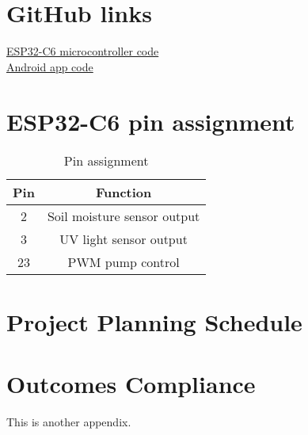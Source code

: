 \chapter{GitHub links}
\makeatletter{}\makeatother
\label{appen:derivations_bigramseg}

\href{https://github.com/22546723/skripsie_esp32_code}{ESP32-C6 microcontroller code} \\
\href{https://github.com/22546723/skripsie_android_app}{Android app code}

\chapter{ESP32-C6 pin assignment}
\makeatletter{}\makeatother
\label{appen:derivations_bigramseg}

\begin{table}[!h]
    \centering
    \begin{tabular}{|c|c|}
        \hline
        Pin & Function \\
        \hline
        2 & Soil moisture sensor output \\
        3 & UV light sensor output \\
        23 & PWM pump control \\
        \hline
    \end{tabular}
    \caption{Pin assignment}
    \label{tab:pin_assignment}
\end{table}

\chapter{Project Planning Schedule}
\makeatletter{}\makeatother
\label{appen:derivations_bigramseg}



\chapter{Outcomes Compliance}
\makeatletter{}\makeatother
\label{appen:derivations_bigramseg}

This is another appendix.
